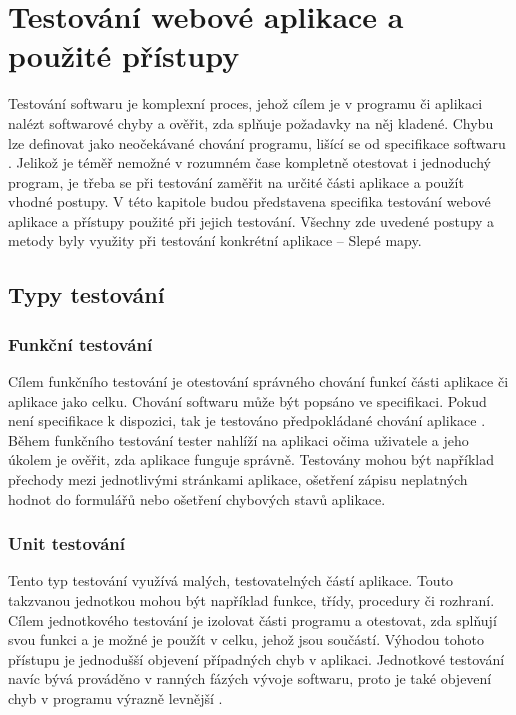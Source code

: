 \documentclass[
    color,   %
	table,   %
    twoside, %
]{fithesis3}
\begin{document}
  \chapter{Testování webové aplikace a použité přístupy}
  Testování softwaru je komplexní proces, jehož cílem je v programu či aplikaci nalézt softwarové chyby a ověřit, zda splňuje požadavky na něj kladené. Chybu lze definovat jako neočekávané chování programu, lišící se od specifikace softwaru \cite{SoftwareISTQB}. Jelikož je téměř nemožné v rozumném čase kompletně otestovat i jednoduchý program, je třeba se při testování zaměřit na určité části aplikace a použít vhodné postupy. V této kapitole budou představena specifika testování webové aplikace a přístupy použité při jejich testování. Všechny zde uvedené postupy a metody byly využity při testování konkrétní aplikace –  Slepé mapy.
  
  \section{Typy testování}
  \subsection{Funkční testování}
  Cílem funkčního testování je otestování správného chování funkcí části aplikace či aplikace jako celku. Chování softwaru může být popsáno ve specifikaci. Pokud není specifikace k dispozici, tak je testováno předpokládané chování aplikace \cite{FunctionalISTQB}. Během funkčního testování tester nahlíží na aplikaci očima uživatele a jeho úkolem je ověřit, zda aplikace funguje správně. Testovány mohou být například přechody mezi jednotlivými stránkami aplikace, ošetření zápisu neplatných hodnot do formulářů nebo ošetření chybových stavů aplikace.
  
  \subsection{Unit testování}
  Tento typ testování využívá malých, testovatelných částí aplikace. Touto takzvanou jednotkou mohou být například funkce, třídy, procedury či rozhraní. Cílem jednotkového testování je izolovat části programu a otestovat, zda splňují svou funkci a je možné je použít v celku, jehož jsou součástí. Výhodou tohoto přístupu je jednodušší objevení případných chyb v aplikaci. Jednotkové testování navíc bývá prováděno v ranných fázých vývoje softwaru, proto je také objevení chyb v programu výrazně levnější \cite{UnitISTQB}.
  
\end{document}
